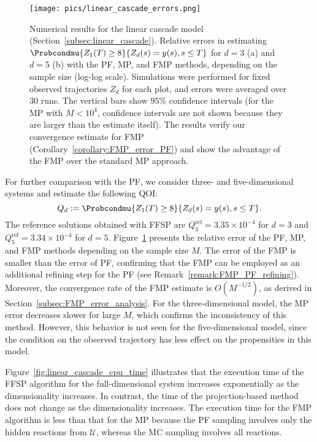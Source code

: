 \begin{figure}
    \centering
    \texttt{[image: pics/linear\_cascade\_errors.png]}
    \caption{
    Numerical results for the linear cascade model (Section~\ref{subsec:linear_cascade}). 
    Relative errors in estimating $\Probcondmu{Z_1(T) \geq 8}{Z_d(s) = y(s), s \leq T}$ for $d=3$ (a) and $d=5$ (b) with the \ac{PF}, \ac{MP}, and \ac{FMP} methods, depending on the sample size (log-log scale). 
    Simulations were performed for fixed observed trajectories $Z_d$ for each plot, and errors were averaged over 30 runs. The vertical bars show $95 \%$ confidence intervals (for the MP with $M < 10^4$, confidence intervals are not shown because they are larger than the estimate itself).
    The results verify our convergence estimate for \ac{FMP} (Corollary~\ref{corollary:FMP_error_PF}) and show the advantage of the \ac{FMP} over the standard \ac{MP} approach.
    }
    \label{fig:linear_cascade_convergence}
\end{figure}

For further comparison with the \ac{PF}, we consider three- and five-dimensional systems and estimate the following \ac{QOI}: 
$$ 
    Q_d := \Probcondmu{Z_1(T) \geq 8}{Z_d(s) = y(s), s \leq T}.
$$ 
The reference solutions obtained with \ac{FFSP} are $Q^{\text{ref}}_{3} =  3.35 \times 10^{-4} $ for $d=3$ and $Q^{\text{ref}}_{5} =  3.34 \times 10^{-4}$ for $d=5$. Figure~\ref{fig:linear_cascade_convergence} presents the relative error of the \ac{PF}, \ac{MP}, and \ac{FMP} methods depending on the sample size $M$. The error of the \ac{FMP} is smaller than the error of \ac{PF}, confirming that the \ac{FMP} can be employed as an additional refining step for the \ac{PF} (see Remark~\ref{remark:FMP_PF_refining}). Moreover, the convergence rate of the \ac{FMP} estimate is $O(M^{-1/2})$, as derived in Section~\ref{subsec:FMP_error_analysis}. For the three-dimensional model, the \ac{MP} error decreases slower for large $M$, which confirms the inconsistency of this method. However, this behavior is not seen for the five-dimensional model, since the condition on the observed trajectory has less effect on the propensities in this model.

Figure~\ref{fig:linear_cascade_cpu_time} illustrates that the execution time of the \ac{FFSP} algorithm for the full-dimensional system increases exponentially as the dimensionality increases. In contrast, the time of the projection-based method does not change as the dimensionality increases. The execution time for the \ac{FMP} algorithm is less than that for the \ac{MP} because the \ac{PF} sampling involves only the hidden reactions from $\mathcal{U}$, whereas the \ac{MC} sampling involves all reactions.


